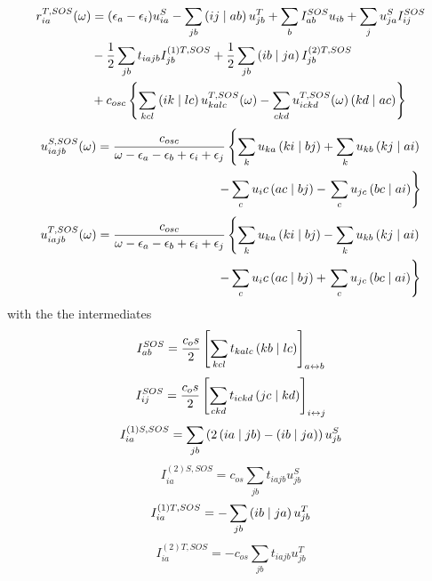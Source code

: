 \begin{equation}
\begin{split}
r_{ia}^{T,SOS}(\omega) &= (\epsilon_a - \epsilon_i) u_{ia}^S - \sum_{jb} \left( ij \mid ab \right) u_{jb}^T + \sum_b I^{SOS}_{ab} u_{ib} + \sum_j u_{ja}^S I^{SOS}_{ij} \\
&- \frac{1}{2} \sum_{jb} t_{iajb}I^{(1)T,SOS}_{jb} + \frac{1}{2} \sum_{jb} \left( ib \mid ja \right) I^{(2)T,SOS}_{jb} \\
&+ c_{osc} \left\lbrace \sum_{kcl} \left( ik \mid lc \right) u^{T,SOS}_{kalc}(\omega) - \sum_{ckd} u^{T,SOS}_{ickd}(\omega) \left( kd \mid ac \right) \right\rbrace
\end{split}
\end{equation} 
\begin{equation}
\begin{split}
u_{iajb}^{S,SOS}(\omega) = \frac{c_{osc}}{\omega - \epsilon_a - \epsilon_b + \epsilon_i + \epsilon_j} \left\lbrace \sum_k u_{ka} \left( ki \mid bj \right) + \sum_{k} u_{kb} \left( kj \mid ai \right) \right. \\ - \sum_c u_ic \left( ac \mid bj \right) - \left. \sum_{c} u_{jc} \left( bc \mid ai \right) \right\rbrace
\end{split}
\end{equation}
\begin{equation}
\begin{split}
u_{iajb}^{T,SOS}(\omega) = \frac{c_{osc}}{\omega - \epsilon_a - \epsilon_b + \epsilon_i + \epsilon_j} \left\lbrace \sum_k u_{ka} \left( ki \mid bj \right) - \sum_{k} u_{kb} \left( kj \mid ai \right) \right. \\ - \sum_c u_ic \left( ac \mid bj \right) + \left. \sum_{c} u_{jc} \left( bc \mid ai \right) \right\rbrace
\end{split}
\end{equation}
\noindent with the the intermediates
\begin{equation}
I_{ab}^{SOS} = \frac{c_os}{2} \left[ \sum_{kcl} t_{kalc} \left( kb \mid lc \right) \right]_{a \leftrightarrow b}
\end{equation}
\begin{equation}
I_{ij}^{SOS} = \frac{c_os}{2} \left[ \sum_{ckd} t_{ickd} \left( jc \mid kd \right) \right]_{i \leftrightarrow j}
\end{equation}
\begin{equation}
I^{(1)S,SOS}_{ia} = \sum_{jb} \left( 2\left( ia \mid jb \right) - \left( ib \mid ja \right) \right) u_{jb}^S
\end{equation}
\begin{equation}
I^{(2)S,SOS}_{ia} = c_{os} \sum_{jb} t_{iajb} u_{jb}^S
\end{equation}
\begin{equation}
I^{(1)T,SOS}_{ia} = - \sum_{jb} \left( ib \mid ja \right) u_{jb}^T
\end{equation}
\begin{equation}
I^{(2)T,SOS}_{ia} = - c_{os} \sum_{jb} t_{iajb} u_{jb}^T
\end{equation}

